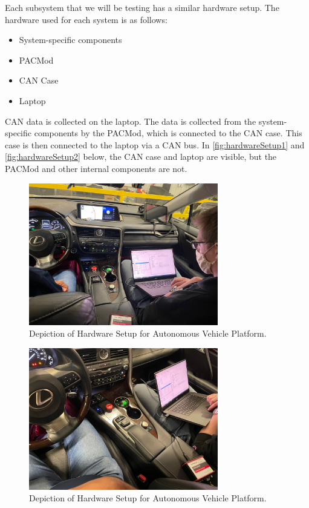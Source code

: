 \documentclass[12pt]{article} %
\begin{document}
Each subsystem that we will be testing has a similar hardware setup. The hardware used for each system is as follows:
\begin{itemize}
	\item System-specific components
	\item PACMod
	\item CAN Case
	\item Laptop
\end{itemize}
CAN data is collected on the laptop. The data is collected from the system-specific components by the PACMod, which is connected to the CAN case. This case is then connected to the laptop via a CAN bus. In \autoref{fig:hardwareSetup1} and \autoref{fig:hardwareSetup2} below, the CAN case and laptop are visible, but the PACMod and other internal components are not. 
%
\begin{figure}[h]
    \centering
    \captionsetup{justification=centering, margin=3cm}
    \includegraphics[width=3.25in]{figs/img/picturesVisitToAStuff/dataColletionSetup1-20211007}
    \caption{Depiction of Hardware Setup for Autonomous Vehicle Platform.}
    \label{fig:hardwareSetup1}
\end{figure}\begin{figure}[h]
    \centering
    \captionsetup{justification=centering, margin=3cm}
    \includegraphics[angle=180,width=3.25in]{figs/img/picturesVisitToAStuff/dataColletionSetup2-20211007}
    \caption{Depiction of Hardware Setup for Autonomous Vehicle Platform.}
    \label{fig:hardwareSetup2}
\end{figure}
%
\end{document}
